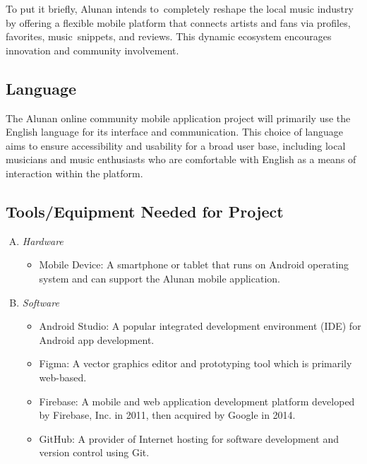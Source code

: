 To put it briefly, Alunan intends to completely reshape the local music industry by offering a flexible mobile platform that connects artists and fans via profiles, favorites, music snippets, and reviews. This dynamic ecosystem encourages innovation and community involvement.

\subsection{Language}
The Alunan online community mobile application project will primarily use the English language for its interface and communication. This choice of language aims to ensure accessibility and usability for a broad user base, including local musicians and music enthusiasts who are comfortable with English as a means of interaction within the platform. \pagebreak

\subsection{Tools/Equipment Needed for Project}
\begin{enumerate}[A.]
    \item \textit{Hardware}
    \begin{itemize}
        \item Mobile Device: A smartphone or tablet that runs on Android operating system and can support the Alunan mobile application.
    \end{itemize}
    \item \textit{Software}
    \begin{itemize}
        \item Android Studio: A popular integrated development environment (IDE) for Android app development.
        \item Figma: A vector graphics editor and prototyping tool which is primarily web-based.
        \item Firebase: A mobile and web application development platform developed by Firebase, Inc. in 2011, then acquired by Google in 2014.
        \item GitHub: A provider of Internet hosting for software development and version control using Git.
    \end{itemize}
\end{enumerate}

